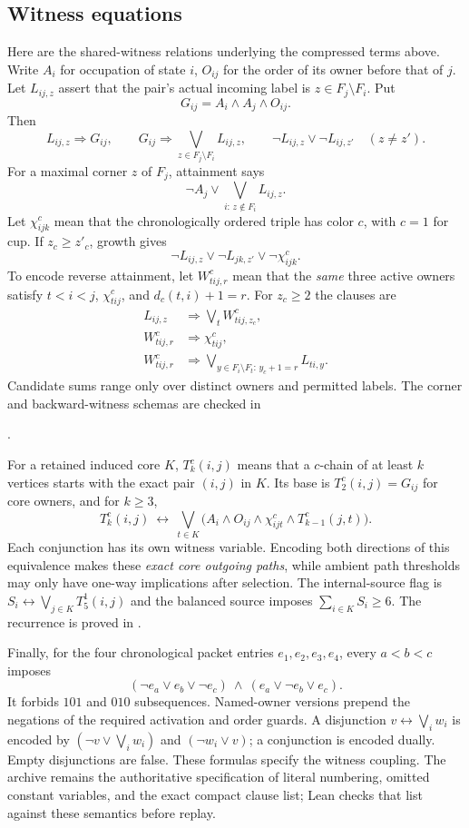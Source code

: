 \subsection{Witness equations}
Here are the shared-witness relations underlying the compressed terms
above. Write $A_i$ for occupation of state $i$, $O_{ij}$ for the order
of its owner before that of $j$. Let $L_{ij,z}$ assert that the pair's
actual incoming label is $z\in F_j\setminus F_i$. Put
\[G_{ij}=A_i\land A_j\land O_{ij}.\]
Then
\[
 L_{ij,z}\Rightarrow G_{ij},\qquad
 G_{ij}\Rightarrow\bigvee_{z\in F_j\setminus F_i}L_{ij,z},\qquad
 \neg L_{ij,z}\lor\neg L_{ij,z'}\quad(z\ne z').
\]
For a maximal corner $z$ of $F_j$, attainment says
\[
 \neg A_j\lor\bigvee_{i:\,z\notin F_i}L_{ij,z}.
\]
Let $\chi^c_{ijk}$ mean that the chronologically ordered triple has
color $c$, with $c=1$ for cup. If $z_c\ge z'_c$, growth gives
\[
 \neg L_{ij,z}\lor\neg L_{jk,z'}\lor\neg\chi^c_{ijk}.
\]
To encode reverse attainment, let $W^c_{tij,r}$ mean that the
\emph{same} three active owners satisfy $t<i<j$,
$\chi^c_{tij}$, and $d_c(t,i)+1=r$. For $z_c\ge2$ the clauses are
\begin{align*}
 L_{ij,z}&\Rightarrow\bigvee_t W^c_{tij,z_c},\\
 W^c_{tij,r}&\Rightarrow\chi^c_{tij},\\
 W^c_{tij,r}&\Rightarrow
   \bigvee_{y\in F_i\setminus F_t:\,y_c+1=r}L_{ti,y}.
\end{align*}
Candidate sums range only over distinct owners and permitted labels.
The corner and backward-witness schemas are checked in
\begin{center}.\end{center}

For a retained induced core $K$, $T^c_k(i,j)$ means that a $c$-chain
of at least $k$ vertices starts with the exact pair $(i,j)$ in $K$.
Its base is $T^c_2(i,j)=G_{ij}$ for core owners, and for $k\ge3$,
\[
 T^c_k(i,j)\ \longleftrightarrow\
 \bigvee_{t\in K}\bigl(A_i\land O_{ij}\land
              \chi^c_{ijt}\land T^c_{k-1}(j,t)\bigr).
\]
Each conjunction has its own witness variable. Encoding both
directions of this equivalence makes these \emph{exact core outgoing
paths}, while ambient path thresholds may only have one-way
implications after selection. The internal-source flag is
$S_i\leftrightarrow\bigvee_{j\in K}T^1_5(i,j)$ and the balanced
source imposes $\sum_{i\in K}S_i\ge6$.
The recurrence is proved in .

Finally, for the four chronological packet entries $e_1,e_2,e_3,e_4$,
every $a<b<c$ imposes
\[
 (\neg e_a\lor e_b\lor\neg e_c)
 \ \land\ (e_a\lor\neg e_b\lor e_c).
\]
It forbids $101$ and $010$ subsequences. Named-owner versions prepend
the negations of the required activation and order guards. A
disjunction $v\leftrightarrow\bigvee_i w_i$ is encoded by
$(\neg v\lor\bigvee_iw_i)$ and $(\neg w_i\lor v)$; a conjunction
is encoded dually. Empty disjunctions are false.
These formulas specify the witness coupling. The archive remains
the authoritative specification of literal numbering, omitted
constant variables, and the exact compact clause list; Lean checks
that list against these semantics before replay.
